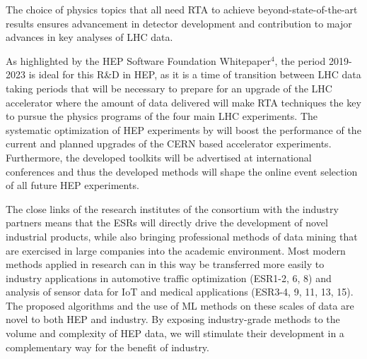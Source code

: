 The choice of physics topics that all need RTA to achieve beyond-state-of-the-art results ensures advancement in detector development and contribution to major advances in key analyses of LHC data.

As highlighted by the HEP Software Foundation Whitepaper$^{4}$, the period 2019-2023 is ideal for this R\&D in HEP, as it is a time of transition between LHC data taking periods that will be necessary to prepare for an upgrade of the LHC accelerator where the amount of data delivered will make RTA techniques  the key to pursue the physics programs of the four main LHC experiments.
The systematic optimization of HEP experiments by \acronym will boost the performance of the current and planned upgrades of the CERN based accelerator experiments.
Furthermore, the developed toolkits will be advertised at international conferences and thus the developed methods will shape the online event selection of all future HEP experiments. 

The close links of the research institutes of the consortium with the industry partners means that the ESRs will directly drive the development of novel industrial products, while also bringing professional methods of data mining that are exercised in large companies into the academic environment. 
Most modern methods applied in research can in this way be transferred more easily to industry applications in automotive traffic optimization (ESR1-2, 6, 8) and analysis of sensor data for IoT and medical applications (ESR3-4, 9, 11, 13, 15).
The proposed algorithms and the use of ML methods on these scales of data are novel to both HEP and industry. 
By exposing industry-grade methods to the volume and complexity of HEP data, we will stimulate their development in a complementary way for the benefit of industry.

